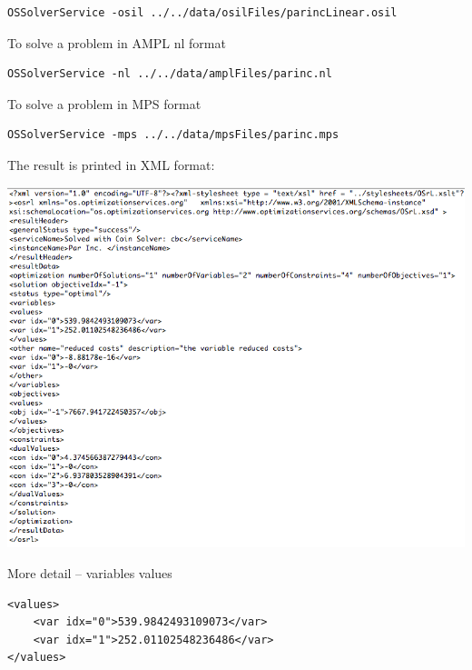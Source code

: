 \documentclass[11pt]{article}
\renewcommand{\_}{{\char"5F}}
\renewcommand{\{}{{\char"7B}}
\renewcommand{\}}{{\char"7D}}
\renewcommand{\^}{{\char"0D}}
\renewcommand{\'}{{\char"0D}}
\begin{document}
{\small
\begin{verbatim}
OSSolverService -osil ../../data/osilFiles/parincLinear.osil
\end{verbatim}

\vfill
\begin{center}
To solve a problem in AMPL nl format
\end{center}
\vfill

\begin{verbatim}
OSSolverService -nl ../../data/amplFiles/parinc.nl
\end{verbatim}

\vfill
\begin{center}
To solve a problem in MPS format
\end{center}
\vfill

\begin{verbatim}
OSSolverService -mps ../../data/mpsFiles/parinc.mps
\end{verbatim}
}%



The result is printed in XML format:


\includegraphics[scale=0.38]{./figures/xmlResult.png}




More detail -- variables values 

\vfill
\begin{verbatim}
<values>
    <var idx="0">539.9842493109073</var>
    <var idx="1">252.01102548236486</var>
</values>\end{verbatim}
\end{document}
